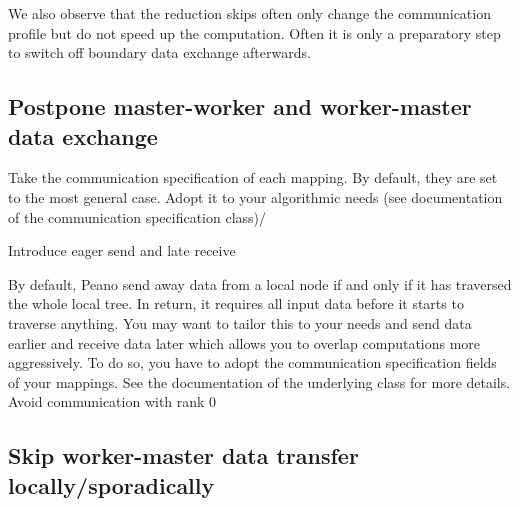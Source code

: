 We also observe that the reduction skips often only change the communication
profile but do not speed up the computation. 
Often it is only a preparatory step to switch off boundary data exchange
afterwards.



\subsection{Postpone master-worker and worker-master data exchange}
    Take the communication specification of each mapping. By default, they are set to the most general case. Adopt it to your algorithmic needs (see documentation of the communication specification class)/


Introduce eager send and late receive

By default, Peano send away data from a local node if and only if it has traversed the whole local tree. In return, it requires all input data before it starts to traverse anything. You may want to tailor this to your needs and send data earlier and receive data later which allows you to overlap computations more aggressively. To do so, you have to adopt the communication specification fields of your mappings. See the documentation of the underlying class for more details.
Avoid communication with rank 0


\subsection{Skip worker-master data transfer locally/sporadically}
